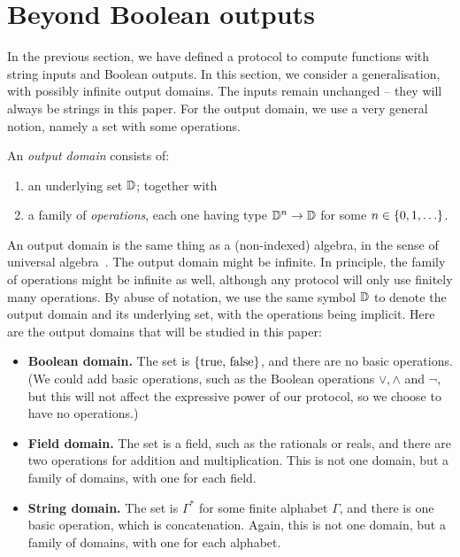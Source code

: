 \section{Beyond Boolean outputs}
\label{sec:beyond-boolean-outputs}

In the previous section, we have defined a protocol to compute functions with string inputs and Boolean outputs. In this section, we consider a generalisation, with possibly infinite output domains. The inputs remain unchanged -- they will always be strings in this paper.  For the output domain, we use a very general notion, namely a set with some operations. 
\begin{definition}
    An \emph{output domain} consists of: 
    \begin{enumerate}
        \item an underlying set $\mathbb D$; together with
        \item a family of \emph{operations}, each one having  type $\mathbb D^n \to \mathbb D$ for some $n \in \{0,1,\ldots\}$.
    \end{enumerate}
\end{definition}
An output domain is the same thing as a (non-indexed) algebra, in the sense of universal algebra~\cite[p.5]{hobby1988structure}. 
The output domain might be infinite. In principle, the family of operations might be infinite as well, although any protocol will only use finitely many operations.
By abuse of notation, we use the same symbol $\mathbb D$ to denote the output domain and its underlying set, with the operations being implicit. Here are the output domains that will be studied in this paper: 
\begin{itemize}
    \item \textbf{Boolean domain.} The set is $\{\text{true, false}\}$, and there are no basic operations. (We could add basic operations, such as the Boolean operations $\lor,\land$ and $\neg$, but this will not affect the expressive power of our protocol, so we choose to have no operations.)
    \item \textbf{Field domain.} The set is a field, such as the rationals or reals, and there are two operations for addition and multiplication. This is not one domain, but a family of domains, with one for each field.
    \item \textbf{String domain.} The set is $\Gamma^*$ for some finite alphabet $\Gamma$, and there is one basic operation, which is concatenation. Again, this is not one domain, but a family of domains, with one for each alphabet.
\end{itemize}

